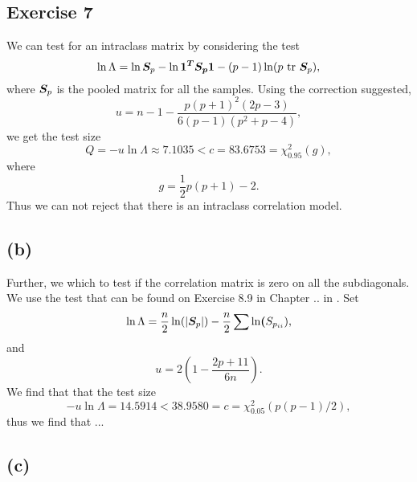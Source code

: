 
\subsection*{Exercise 7}
\label{sec:exercise-7}

We can test for an intraclass matrix by considering the test
\begin{equation*}
  \ln \Lambda = \ln\bm{S}_p - \ln\bm{1^T S_p 1} - (p-1)\ln (p \text{ tr } \bm{S}_p),
\end{equation*}
where $\bm{S}_p$ is the pooled matrix for all the samples. Using the
correction suggested,
$$u = n  - 1 - \frac{p(p+1)^2 (2p-3)}{6(p-1)(p^2+p-4)},$$
we get the test size
\begin{equation*}
  Q = -u \ln \Lambda  \approx  7.1035 < c = 83.6753 = \chi^2_{0.95}(g),
\end{equation*}
where
\begin{equation*}
  g = \frac 12p(p+1) -2.
\end{equation*}
Thus we can not reject that there is an intraclass correlation model.

\subsection*{(b)}
\label{sec:b-6}

Further, we which to test if the correlation matrix is zero on all the
subdiagonals. We use the test that can be found on Exercise 8.9 in
Chapter .. in \cite{book}. Set 
\begin{equation*}
  \ln \Lambda = \frac n2 \ln (|\bm{S}_p |) - \frac n2 \sum \ln\bm{(}S_{p_{ii}}),
\end{equation*}
and 
\begin{equation*}
  u = 2(1 - \frac{2p + 11}{6n}).
\end{equation*}
We find that that the test size
\begin{equation*}
  -u \ln \Lambda = 14.5914 < 38.9580 = c = \chi^2_{0.05}(p(p-1)/2),
\end{equation*}
thus we find that ...

\subsection*{(c)}
\label{sec:c-6}

